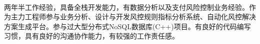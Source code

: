 \documentclass[11pt, a4paper, UTF8]{awesome-cv}
\begin{document}
\makecvheader[R]

\makecvfooter
  {\ }
  {\ }
  {\thepage}




\begin{cvparagraph}
两年半工作经验，具备全栈开发能力，有数据分析以及支付风险控制业务经验。作为主力工程师参与业务分析、设计与开发风控规则指标分析系统、自动化风控解决方案生成平台。参与过大型分布式NoSQL数据库(C++)项目。有良好的代码编写习惯，具有良好的沟通协作能力，有较强的工作责任感。
\end{cvparagraph}
\end{document}
